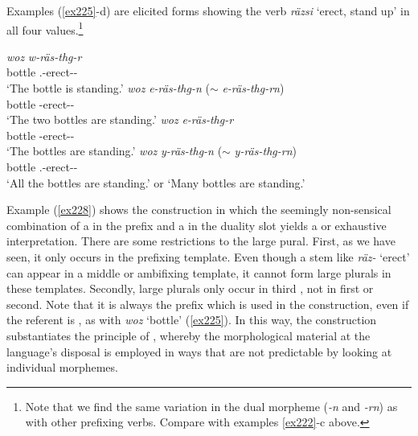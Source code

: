 Examples (\ref{ex225}-d) are elicited forms showing the  verb \emph{räzsi} `erect, stand up' in all four  values.\footnote{Note that we find the same variation in the dual morpheme (\emph{-n} and \emph{-rn}) as with other prefixing verbs. Compare with examples \ref{ex222}-c above.}

\begin{exe}
\ex
\begin{xlist}
	\ex
	\gll \emph{woz} \emph{w-räs-thg-r}\\
	bottle \Tsg.\F-erect-\Stat-\Ndu\\
	\trans `The bottle is standing.'
	\label{ex225}
	\ex
	\gll \emph{woz} \emph{e-räs-thg-n} ($\sim$ \emph{e-räs-thg-rn})\\
	bottle \Stnsg-erect-\Stat-\Du\\
	\trans `The two bottles are standing.'
	\label{ex226}
	\ex
	\gll \emph{woz} \emph{e-räs-thg-r}\\
	bottle \Stnsg-erect-\Stat-\Ndu\\
	\trans `The bottles are standing.'
	\label{ex227}
	\ex
	\gll \emph{woz} \emph{y-räs-thg-n} ($\sim$ \emph{y-räs-thg-rn})\\
	bottle \Tsg.\Masc-erect-\Stat-\Du\\
	\trans `All the bottles are standing.' or `Many bottles are standing.'
	\label{ex228}
\end{xlist}
\end{exe}

Example (\ref{ex228}) shows the  construction in which the seemingly non-sensical combination of a  in the  prefix and a  in the duality slot yields a  or exhaustive  interpretation. There are some restrictions to the large pural. First, as we have seen, it only occurs in the prefixing template. Even though a stem like \emph{räz-} `erect' can appear in a middle or ambifixing template, it cannot form large plurals in these templates. Secondly, large plurals only occur in third , not in first or second. Note that it is always the  prefix which is used in the  construction, even if the referent is , as with \emph{woz} `bottle' (\ref{ex225}). In this way, the  construction substantiates the principle of , whereby the morphological material at the language's disposal is employed in ways that are not predictable by looking at individual morphemes.\\

